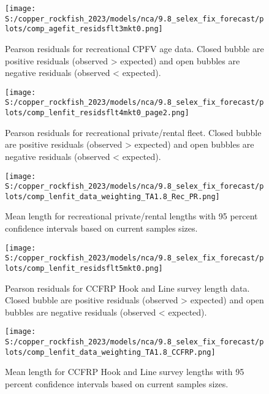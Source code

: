 \documentclass[11pt,
  english,
  letterpaper,
]{article}
\begin{document}
\pagebreak

\begin{figure}
\centering
\texttt{[image: S:/copper\_rockfish\_2023/models/nca/9.8\_selex\_fix\_forecast/plots/comp\_agefit\_residsflt3mkt0.png]}
\caption{Pearson residuals for recreational CPFV age data. Closed bubble are positive residuals (observed \textgreater{} expected) and open bubbles are negative residuals (observed \textless{} expected).\label{fig:rec-cpfv-age-pearson}}
\end{figure}

\pagebreak

\begin{figure}
\centering
\texttt{[image: S:/copper\_rockfish\_2023/models/nca/9.8\_selex\_fix\_forecast/plots/comp\_lenfit\_residsflt4mkt0\_page2.png]}
\caption{Pearson residuals for recreational private/rental fleet. Closed bubble are positive residuals (observed \textgreater{} expected) and open bubbles are negative residuals (observed \textless{} expected).\label{fig:rec-pr-pearson}}
\end{figure}

\pagebreak

\begin{figure}
\centering
\texttt{[image: S:/copper\_rockfish\_2023/models/nca/9.8\_selex\_fix\_forecast/plots/comp\_lenfit\_data\_weighting\_TA1.8\_Rec\_PR.png]}
\caption{Mean length for recreational private/rental lengths with 95 percent confidence intervals based on current samples sizes.\label{fig:rec-pr-mean-len-fit}}
\end{figure}

\pagebreak

\begin{figure}
\centering
\texttt{[image: S:/copper\_rockfish\_2023/models/nca/9.8\_selex\_fix\_forecast/plots/comp\_lenfit\_residsflt5mkt0.png]}
\caption{Pearson residuals for CCFRP Hook and Line survey length data. Closed bubble are positive residuals (observed \textgreater{} expected) and open bubbles are negative residuals (observed \textless{} expected).\label{fig:ccfrp-len-pearson}}
\end{figure}

\pagebreak

\begin{figure}
\centering
\texttt{[image: S:/copper\_rockfish\_2023/models/nca/9.8\_selex\_fix\_forecast/plots/comp\_lenfit\_data\_weighting\_TA1.8\_CCFRP.png]}
\caption{Mean length for CCFRP Hook and Line survey lengths with 95 percent confidence intervals based on current samples sizes.\label{fig:ccfrp-mean-len-fit}}
\end{figure}
\end{document}
